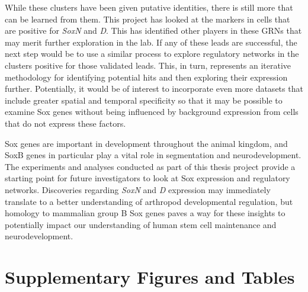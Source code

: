 \documentclass[withindex,glossary]{cam-thesis}
\begin{document}
While these clusters have been given putative identities, there is still
more that can be learned from them. This project has looked at the
markers in cells that are positive for \emph{SoxN} and \emph{D}. This
has identified other players in these GRNs that may merit further
exploration in the lab. If any of these leads are successful, the next
step would be to use a similar process to explore regulatory networks in
the clusters positive for those validated leads. This, in turn,
represents an iterative methodology for identifying potential hits and
then exploring their expression further. Potentially, it would be of
interest to incorporate even more datasets that include greater spatial
and temporal specificity so that it may be possible to examine Sox genes
without being influenced by background expression from cells that do not
express these factors.

Sox genes are important in development throughout the animal kingdom,
and SoxB genes in particular play a vital role in segmentation and
neurodevelopment. The experiments and analyses conducted as part of this
thesis project provide a starting point for future investigators to look
at Sox expression and regulatory networks. Discoveries regarding
\emph{SoxN} and \emph{D} expression may immediately translate to a
better understanding of arthropod developmental regulation, but homology
to mammalian group B Sox genes paves a way for these insights to
potentially impact our understanding of human stem cell maintenance and
neurodevelopment.

\cleardoublepage
{}






\appendix{}

\chapter{Supplementary Figures and Tables}

\makeatletter 
\renewcommand{\thefigure}{S\@arabic\c@figure}
\makeatother
\setcounter{figure}{0}
\end{document}
